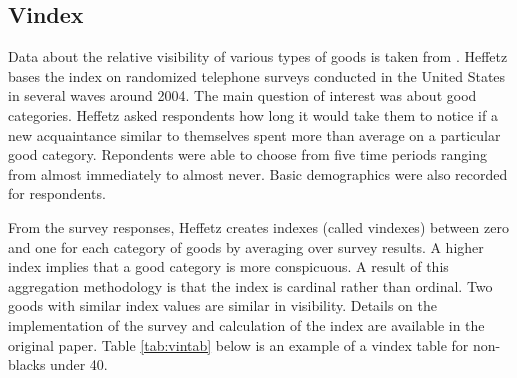\documentclass[12pt]{article}
\begin{document}
\subsection{Vindex}
Data about the relative visibility of  various types of goods is taken from \citet{Heffetz2011}.  
Heffetz bases the index on randomized telephone surveys conducted in the United States in several waves around 2004.
The main question of interest was about good categories.
Heffetz asked respondents how long it would take them to notice if a new acquaintance similar to themselves spent more than average on a particular good category.
Repondents were able to choose from five time periods ranging from almost immediately to almost never.  
Basic demographics were also recorded for respondents.  

From the survey responses, Heffetz creates indexes (called vindexes) between zero and one for each category of goods by averaging over survey results.  
A higher index implies that a good category is  more conspicuous. 
A result of this aggregation methodology is that the index is cardinal rather than ordinal.  Two goods with similar index values are similar in visibility.  Details on the implementation of the survey and calculation of the index are available in the original paper.
Table \ref{tab:vintab} below is an example of a vindex table for non-blacks under 40.
\end{document}
